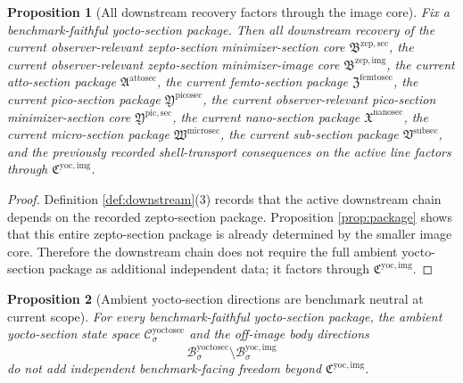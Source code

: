 \documentclass[11pt]{article}
\newcommand{\SubSectionPackage}{\mathfrak V^{\mathrm{subsec}}}
\newcommand{\MicroSectionPackage}{\mathfrak W^{\mathrm{microsec}}}
\newcommand{\NanoSectionPackage}{\mathfrak X^{\mathrm{nanosec}}}
\newcommand{\PicoSectionPackage}{\mathfrak Y^{\mathrm{picosec}}}
\newcommand{\PicoMinSectionCore}{\mathfrak Y^{\mathrm{pic,sec}}}
\newcommand{\FemtoSectionPackage}{\mathfrak Z^{\mathrm{femtosec}}}
\newcommand{\AttoSectionPackage}{\mathfrak A^{\mathrm{attosec}}}
\newcommand{\ZeptoImageCore}{\mathfrak B^{\mathrm{zep,img}}}
\newcommand{\ZeptoMinSectionCore}{\mathfrak B^{\mathrm{zep,sec}}}
\newcommand{\YoctoSectionSpace}[1]{\mathcal C_{#1}^{\mathrm{yoctosec}}}
\newcommand{\YoctoSectionBody}[1]{\mathcal B_{#1}^{\mathrm{yoctosec}}}
\newcommand{\YoctoImageCore}{\mathfrak C^{\mathrm{yoc,img}}}
\newcommand{\YoctoImgBody}[1]{\mathcal B_{#1}^{\mathrm{yoc,img}}}
\newtheorem{proposition}{Proposition}
\begin{document}
\begin{proposition}[All downstream recovery factors through the image core]
\label{prop:downstream}
Fix a benchmark-faithful yocto-section package. Then all downstream recovery of the current observer-relevant zepto-section minimizer-section core \(\ZeptoMinSectionCore\), the current observer-relevant zepto-section minimizer-image core \(\ZeptoImageCore\), the current atto-section package \(\AttoSectionPackage\), the current femto-section package \(\FemtoSectionPackage\), the current pico-section package \(\PicoSectionPackage\), the current observer-relevant pico-section minimizer-section core \(\PicoMinSectionCore\), the current nano-section package \(\NanoSectionPackage\), the current micro-section package \(\MicroSectionPackage\), the current sub-section package \(\SubSectionPackage\), and the previously recorded shell-transport consequences on the active line factors through \(\YoctoImageCore\).
\end{proposition}

\begin{proof}
Definition \ref{def:downstream}(3) records that the active downstream chain depends on the recorded zepto-section package. Proposition \ref{prop:package} shows that this entire zepto-section package is already determined by the smaller image core. Therefore the downstream chain does not require the full ambient yocto-section package as additional independent data; it factors through \(\YoctoImageCore\).
\end{proof}

\begin{proposition}[Ambient yocto-section directions are benchmark neutral at current scope]
\label{prop:neutral}
For every benchmark-faithful yocto-section package, the ambient yocto-section state space \(\YoctoSectionSpace{\sigma}\) and the off-image body directions
\[
\YoctoSectionBody{\sigma}\setminus\YoctoImgBody{\sigma}
\]
do not add independent benchmark-facing freedom beyond \(\YoctoImageCore\).
\end{proposition}
\end{document}
